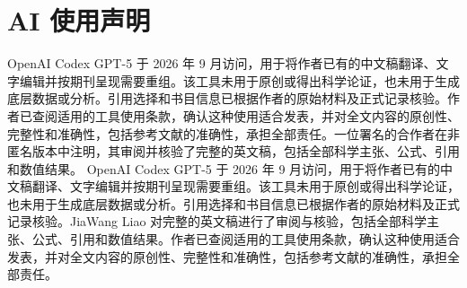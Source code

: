 \section*{AI 使用声明}
\ifdefined\anonymousversion
OpenAI Codex GPT-5 于 2026 年 9 月访问，用于将作者已有的中文稿翻译、文字编辑并按期刊呈现需要重组。该工具未用于原创或得出科学论证，也未用于生成底层数据或分析。引用选择和书目信息已根据作者的原始材料及正式记录核验。作者已查阅适用的工具使用条款，确认这种使用适合发表，并对全文内容的原创性、完整性和准确性，包括参考文献的准确性，承担全部责任。一位署名的合作者在非匿名版本中注明，其审阅并核验了完整的英文稿，包括全部科学主张、公式、引用和数值结果。
\else
OpenAI Codex GPT-5 于 2026 年 9 月访问，用于将作者已有的中文稿翻译、文字编辑并按期刊呈现需要重组。该工具未用于原创或得出科学论证，也未用于生成底层数据或分析。引用选择和书目信息已根据作者的原始材料及正式记录核验。JiaWang Liao 对完整的英文稿进行了审阅与核验，包括全部科学主张、公式、引用和数值结果。作者已查阅适用的工具使用条款，确认这种使用适合发表，并对全文内容的原创性、完整性和准确性，包括参考文献的准确性，承担全部责任。
\fi

